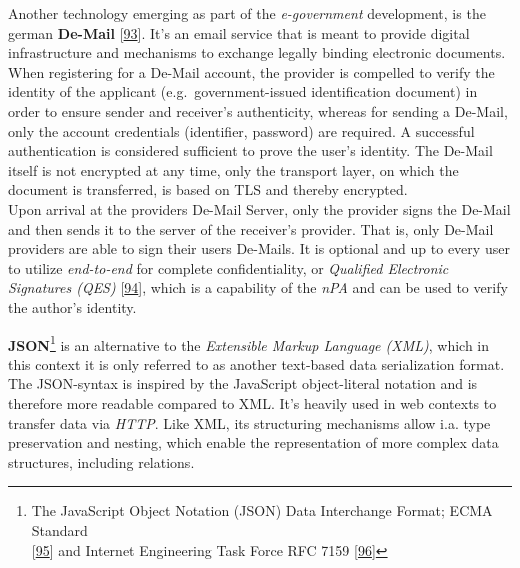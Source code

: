 \documentclass[12pt,english,a4paper,titlepage,cleardoublepage=empty,dottedtoc]{report}
\begin{document}
Another technology emerging as part of the \emph{e-government}
development, is the german
\textbf{\protect\hypertarget{def--de-mail}{}{De-Mail}}
{[}\protect\hyperlink{ref-web_2017_about-de-mail}{93}{]}. It's an email
service that is meant to provide digital infrastructure and mechanisms
to exchange legally binding electronic documents.\\
When registering for a De-Mail account, the provider is compelled to
verify the identity of the applicant (e.g.~government-issued
identification document) in order to ensure sender and receiver's
authenticity, whereas for sending a De-Mail, only the account
credentials (identifier, password) are required. A successful
authentication is considered sufficient to prove the user's identity.
The De-Mail itself is not encrypted at any time, only the transport
layer, on which the document is transferred, is based on TLS and thereby
encrypted.\\
Upon arrival at the providers De-Mail Server, only the provider signs
the De-Mail and then sends it to the server of the receiver's provider.
That is, only De-Mail providers are able to sign their users De-Mails.
It is optional and up to every user to utilize \emph{end-to-end} for
complete confidentiality, or \emph{Qualified Electronic Signatures
(QES)} {[}\protect\hyperlink{ref-web_2017_wikipedia_qes}{94}{]}, which
is a capability of the \emph{nPA} and can be used to verify the author's
identity.

\textbf{JSON}\footnote{The JavaScript Object Notation (JSON) Data
  Interchange Format; ECMA Standard\\
  {[}\protect\hyperlink{ref-web_spec_json}{95}{]} and Internet
  Engineering Task Force RFC 7159
  {[}\protect\hyperlink{ref-web_rfc_json}{96}{]}} is an alternative to
the \emph{Extensible Markup Language (XML)}, which in this context it is
only referred to as another text-based data serialization format. The
JSON-syntax is inspired by the JavaScript object-literal notation and is
therefore more readable compared to XML. It's heavily used in web
contexts to transfer data via \emph{HTTP}. Like XML, its structuring
mechanisms allow i.a. type preservation and nesting, which enable the
representation of more complex data structures, including relations.
\end{document}

